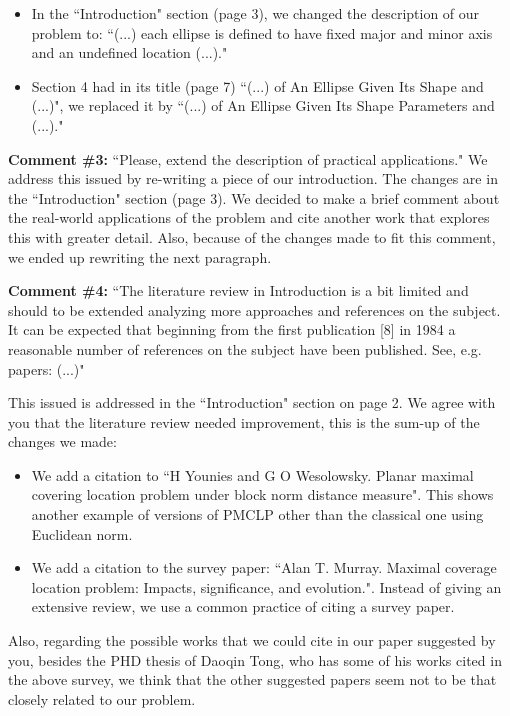 \documentclass[letterpaper]{letter}
\begin{document}
\begin{letter}{}
\begin{itemize}
			\item In the ``Introduction" section (page 3), we changed the description of our problem to: ``(...) each ellipse is defined to have fixed major and minor axis and an undefined location (...)."
			
			\item Section 4 had in its title (page 7) ``(...) of An Ellipse Given Its Shape and (...)", we replaced it by ``(...) of An Ellipse Given Its Shape Parameters and (...)."
		\end{itemize}
		
		\textbf{Comment \#3:} ``Please, extend the description of practical applications."
		We address this issued by re-writing a piece of our introduction. The changes are in the ``Introduction" section (page 3). We decided to make a brief comment about the real-world applications of the problem and cite another work that explores this with greater detail. Also, because of the changes made to fit this comment, we ended up rewriting the next paragraph.
		
		\textbf{Comment \#4:} ``The literature review in Introduction is a bit limited and should to be extended analyzing more approaches and references on the subject. It can be expected that beginning from the first publication [8] in 1984 a reasonable number of references on the subject have been published. See, e.g. papers: (...)"
		
		This issued is addressed in the ``Introduction" section on page 2. We agree with you that the literature review needed improvement, this is the sum-up of the changes we made:

		\begin{itemize}
			\item We add a citation to ``H Younies and G O Wesolowsky. Planar maximal covering location problem under block norm distance measure". This shows another example of versions of PMCLP other than the classical one using Euclidean norm.
			\item We add a citation to the survey paper: ``Alan T. Murray. Maximal coverage location problem: Impacts, significance, and evolution.". Instead of giving an extensive review, we use a common practice of citing a survey paper. 
		\end{itemize}
	
		Also, regarding the possible works that we could cite in our paper suggested by you, besides the PHD thesis of Daoqin Tong, who has some of his works cited in the above survey, we think that the other suggested papers seem not to be that closely related to our problem.
		

\end{letter}
\end{document}
